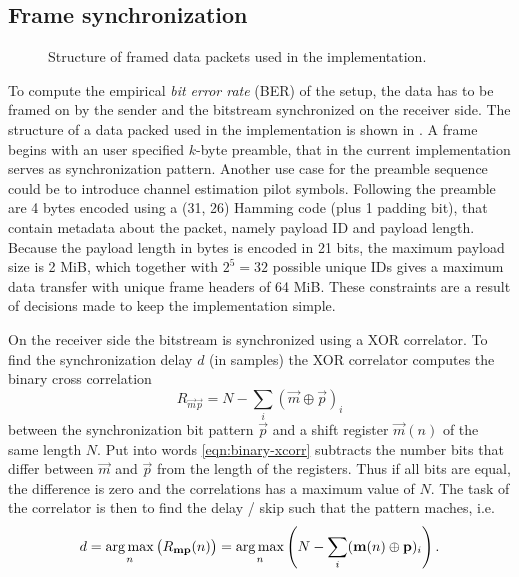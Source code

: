 \subsection{Frame synchronization}

\begin{figure}
	\centering
	
	\caption{
		Structure of framed data packets used in the implementation.
		\label{fig:dataframe}
	}
\end{figure}

To compute the empirical \emph{bit error rate} (BER) of the setup, the data has to be framed on by the sender and the bitstream synchronized on the receiver side. The structure of a data packed used in the implementation is shown in . A frame begins with an user specified \(k\)-byte preamble, that in the current implementation serves as synchronization pattern. Another use case for the preamble sequence could be to introduce channel estimation pilot symbols. Following the preamble are 4 bytes encoded using a (31, 26) Hamming code (plus 1 padding bit), that contain metadata about the packet, namely payload ID and payload length. Because the payload length in bytes is encoded in 21 bits, the maximum payload size is 2 MiB, which together with \(2^5 = 32\) possible unique IDs gives a maximum data transfer with unique frame headers of 64 MiB. These constraints are a result of decisions made to keep the implementation simple.

On the receiver side the bitstream is synchronized using a XOR correlator. To find the synchronization delay \(d\) (in samples) the XOR correlator computes the binary cross correlation
\begin{equation} \label{eqn:binary-xcorr}
	R_{\vec{m}\vec{p}} = N - \sum_i (\vec{m} \oplus \vec{p})_i
\end{equation}
between the synchronization bit pattern \(\vec{p}\) and a shift register \(\vec{m}(n)\) of the same length \(N\). Put into words \eqref{eqn:binary-xcorr} subtracts the number bits that differ between \(\vec{m}\) and \(\vec{p}\) from the length of the registers. Thus if all bits are equal, the difference is zero and the correlations has a maximum value of \(N\). The task of the correlator is then to find the delay / skip such that the pattern maches, i.e.
\begin{equation}
	d = \operatorname*{arg\,max}_n \big( R_{\mathbf{\bm{m}}\mathbf{\bm{p}}}(n) \big)
		= \operatorname*{arg\,max}_n \left( N - \sum_i (\mathbf{\bm{m}}(n) \oplus \mathbf{\bm{p}})_i \right)
	.
\end{equation}


